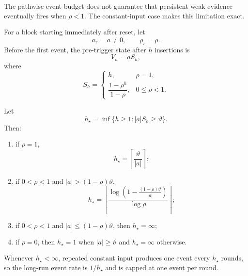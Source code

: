The pathwise event budget does not guarantee that persistent weak evidence eventually fires when $\rho<1$. The constant-input case makes this limitation exact.

For a block starting immediately after reset, let
\begin{equation}
    a_r=a\neq0,
    \qquad
    \rho_r=\rho.
\end{equation}
Before the first event, the pre-trigger state after $h$ insertions is
\begin{equation}
    V_h=aS_h,
    \label{eq:t2-constant-state}
\end{equation}
where
\begin{equation}
    S_h=
    \begin{cases}
        h, & \rho=1,\\[1mm]
        \dfrac{1-\rho^h}{1-\rho}, & 0\leq\rho<1.
    \end{cases}
    \label{eq:t2-geometric-sum}
\end{equation}

\begin{proposition}
\label{prop:t2-constant-firing}
Let
\begin{equation}
    h_\star=\inf\{h\geq1:|a|S_h\geq\vartheta\}.
    \label{eq:t2-hstar-definition}
\end{equation}
Then:
\begin{enumerate}
    \item if $\rho=1$,
    \begin{equation}
        h_\star
        =
        \left\lceil\frac{\vartheta}{|a|}\right\rceil;
        \label{eq:t2-hstar-if}
    \end{equation}
    \item if $0<\rho<1$ and $|a|>(1-\rho)\vartheta$,
    \begin{equation}
        h_\star
        =
        \left\lceil
        \frac{
            \log\left(1-\frac{(1-\rho)\vartheta}{|a|}\right)
        }{\log\rho}
        \right\rceil;
        \label{eq:t2-hstar-lif}
    \end{equation}
    \item if $0<\rho<1$ and $|a|\leq(1-\rho)\vartheta$, then $h_\star=\infty$;
    \item if $\rho=0$, then $h_\star=1$ when $|a|\geq\vartheta$ and $h_\star=\infty$ otherwise.
\end{enumerate}
Whenever $h_\star<\infty$, repeated constant input produces one event every $h_\star$ rounds, so the long-run event rate is $1/h_\star$ and is capped at one event per round.
\end{proposition}

